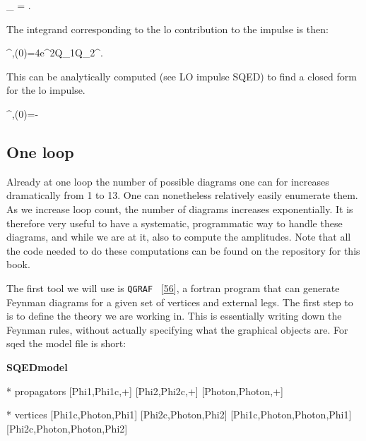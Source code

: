 \documentclass[
  11pt,
  a4paper,
  DIV=11,
  numbers=noendperiod,
  twoside]{scrreprt}
\newenvironment{Shaded}{\begin{snugshade}}{\end{snugshade}}
\newcommand{\NormalTok}[1]{\textcolor[rgb]{0.00,0.23,0.31}{#1}}
\let\[\relax \let\]\relax %
\DeclareRobustCommand{\[}{\begin{equation}}
\DeclareRobustCommand{\]}{\end{equation}}
\begin{document}
\[
\lim\limits_{\hbar {}} \dPsb{\tw}=\dn[4]{\tw} \cancel{\ndeltafn{2\semom[1]\cdot\tw}}\cancel{\ndeltafn{2\semom[1]\cdot \tw }}.
\]

The integrand corresponding to the \gls{lo} contribution to the impulse
is then:

\[
\Delta \emom[1]^{\mu,(0)}=4e^2Q_1Q_2\mass[1]\mass[2]\relfact\int\dn[4]{\tw}\tw^\mu {}.
\]

This can be analytically computed (see LO impulse SQED) to find a closed
form for the \gls{lo} impulse.

\[
\Delta \emom[1]^{\mu,(0)}=-  
\]

\hypertarget{one-loop}{%
\subsection{One loop}\label{one-loop}}

Already at one loop the number of possible diagrams one can for
increases dramatically from 1 to 13. One can nonetheless relatively
easily enumerate them. As we increase loop count, the number of diagrams
increases exponentially. It is therefore very useful to have a
systematic, programmatic way to handle these diagrams, and while we are
at it, also to compute the amplitudes. Note that all the code needed to
do these computations can be found on the repository for this book.

The first tool we will use is \texttt{QGRAF}
~{[}\protect\hyperlink{ref-Nogueira:1993a}{56}{]}, a fortran program
that can generate Feynman diagrams for a given set of vertices and
external legs. The first step to is to define the theory we are working
in. This is essentially writing down the Feynman rules, without actually
specifying what the graphical objects are. For \gls{sqed} the model file
is short:

\textbf{SQEDmodel}

\begin{Shaded}
\begin{Highlighting}[]
\NormalTok{* propagators}
\NormalTok{ [Phi1,Phi1c,+]}
\NormalTok{ [Phi2,Phi2c,+]}
\NormalTok{ [Photon,Photon,+]}

\NormalTok{* vertices}
\NormalTok{ [Phi1c,Photon,Phi1]}
\NormalTok{ [Phi2c,Photon,Phi2]}
\NormalTok{ [Phi1c,Photon,Photon,Phi1]}
\NormalTok{ [Phi2c,Photon,Photon,Phi2]}
\end{Highlighting}
\end{Shaded}
\end{document}
